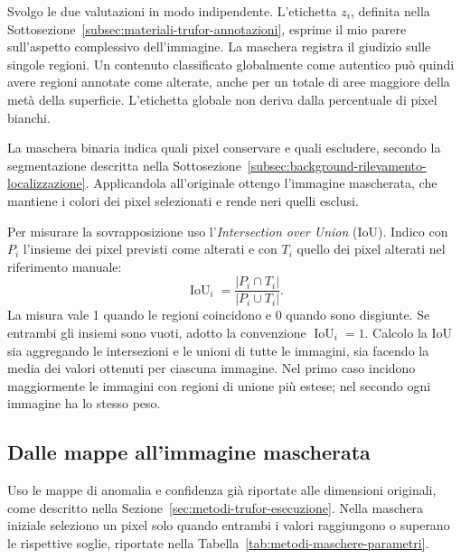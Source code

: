 Svolgo le due valutazioni in modo indipendente. L'etichetta $z_i$, definita nella Sottosezione~\ref{subsec:materiali-trufor-annotazioni}, esprime il mio parere sull'aspetto complessivo dell'immagine. La maschera registra il giudizio sulle singole regioni. Un contenuto classificato globalmente come autentico può quindi avere regioni annotate come alterate, anche per un totale di aree maggiore della metà della superficie. L'etichetta globale non deriva dalla percentuale di pixel bianchi.

La maschera binaria indica quali pixel conservare e quali escludere, secondo la segmentazione descritta nella Sottosezione~\ref{subsec:background-rilevamento-localizzazione}. Applicandola all'originale ottengo l'immagine mascherata, che mantiene i colori dei pixel selezionati e rende neri quelli esclusi.

Per misurare la sovrapposizione uso l'\emph{Intersection over Union} (IoU). Indico con $P_i$ l'insieme dei pixel previsti come alterati e con $T_i$ quello dei pixel alterati nel riferimento manuale:
\begin{equation}
    \operatorname{IoU}_i=\frac{|P_i\cap T_i|}{|P_i\cup T_i|}.
    \label{eq:maschere-iou}
\end{equation}
La misura vale 1 quando le regioni coincidono e 0 quando sono disgiunte. Se entrambi gli insiemi sono vuoti, adotto la convenzione $\operatorname{IoU}_i=1$. Calcolo la IoU sia aggregando le intersezioni e le unioni di tutte le immagini, sia facendo la media dei valori ottenuti per ciascuna immagine. Nel primo caso incidono maggiormente le immagini con regioni di unione più estese; nel secondo ogni immagine ha lo stesso peso.

\subsection{Dalle mappe all'immagine mascherata}
\label{subsec:metodi-maschere-creazione}

Uso le mappe di anomalia e confidenza già riportate alle dimensioni originali, come descritto nella Sezione~\ref{sec:metodi-trufor-esecuzione}. Nella maschera iniziale seleziono un pixel solo quando entrambi i valori raggiungono o superano le rispettive soglie, riportate nella Tabella~\ref{tab:metodi-maschere-parametri}.

